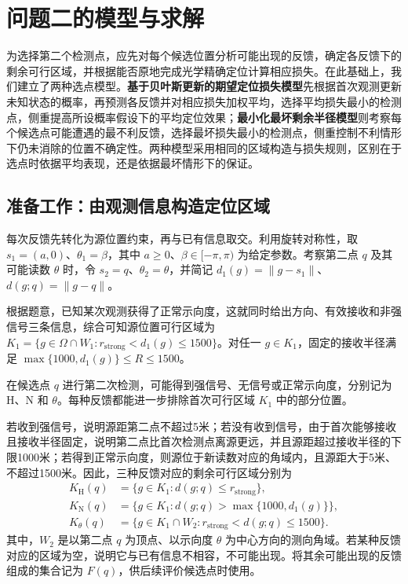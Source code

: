 \documentclass[UTF8,a4paper,zihao=-4,fontset=none]{ctexart}
\begin{document}
\section{问题二的模型与求解}

为选择第二个检测点，应先对每个候选位置分析可能出现的反馈，确定各反馈下的剩余可行区域，并根据能否原地完成光学精确定位计算相应损失。在此基础上，我们建立了两种选点模型。\textbf{基于贝叶斯更新的期望定位损失模型}先根据首次观测更新未知状态的概率，再预测各反馈并对相应损失加权平均，选择平均损失最小的检测点，侧重提高所设概率假设下的平均定位效果；\textbf{最小化最坏剩余半径模型}则考察每个候选点可能遭遇的最不利反馈，选择最坏损失最小的检测点，侧重控制不利情形下仍未消除的位置不确定性。两种模型采用相同的区域构造与损失规则，区别在于选点时依据平均表现，还是依据最坏情形下的保证。

\subsection{准备工作：由观测信息构造定位区域}

每次反馈先转化为源位置约束，再与已有信息取交。利用旋转对称性，取 \(s_1=(a,0)\)、\(\theta_1=\beta\)，其中 \(a\ge0\)、\(\beta\in[-\pi,\pi)\) 为给定参数。考察第二点 \(q\) 及其可能读数 \(\theta\) 时，令 \(s_2=q\)、\(\theta_2=\theta\)，并简记 \(d_1(g)=\|g-s_1\|\)、\(d(g;q)=\|g-q\|\)。

根据题意，已知某次观测获得了正常示向度，这就同时给出方向、有效接收和非强信号三条信息，综合可知源位置可行区域为 \(K_1=\{g\in\Omega\cap W_1:r_{\mathrm{strong}}<d_1(g)\le1500\}\)。对任一 \(g\in K_1\)，固定的接收半径满足 \(\max\{1000,d_1(g)\}\le R\le1500\)。

在候选点 \(q\) 进行第二次检测，可能得到强信号、无信号或正常示向度，分别记为 \(\mathrm H\)、\(\mathrm N\) 和 \(\theta\)。每种反馈都能进一步排除首次可行区域 \(K_1\) 中的部分位置。

若收到强信号，说明源距第二点不超过5米；若没有收到信号，由于首次能够接收且接收半径固定，说明第二点比首次检测点离源更远，并且源距超过接收半径的下限1000米；若得到正常示向度，则源位于新读数对应的角域内，且源距大于5米、不超过1500米。因此，三种反馈对应的剩余可行区域分别为
\begin{equation}
\begin{aligned}
K_{\mathrm H}(q)&=\{g\in K_1:d(g;q)\le r_{\mathrm{strong}}\},\\
K_{\mathrm N}(q)&=\{g\in K_1:d(g;q)>\max\{1000,d_1(g)\}\},\\
K_\theta(q)&=\{g\in K_1\cap W_2:r_{\mathrm{strong}}<d(g;q)\le1500\}.
\end{aligned}
\label{eq:q2-pair-regions}
\end{equation}
其中，\(W_2\) 是以第二点 \(q\) 为顶点、以示向度 \(\theta\) 为中心方向的测向角域。若某种反馈对应的区域为空，说明它与已有信息不相容，不可能出现。将其余可能出现的反馈组成的集合记为 \(F(q)\)，供后续评价候选点时使用。
\end{document}
